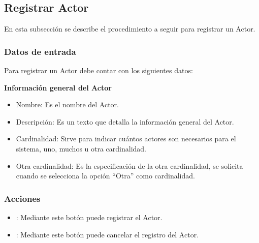 \subsection{Registrar Actor}
En esta subsección se describe el procedimiento a seguir para registrar un Actor.

\subsubsection{Datos de entrada}
\begin{description}
	\item Para registrar un Actor debe contar con los siguientes datos: \hspace{10pt}
	\begin{description}
	    \item \textbf{Información general del Actor}
	    \begin{itemize}
		  \item Nombre: Es el nombre del Actor.
		  \item Descripción: Es un texto que detalla la información general del Actor.
		  \item Cardinalidad: Sirve para indicar cuántos actores son necesarios para el sistema, uno, muchos u otra cardinalidad.
		  \item Otra cardinalidad: Es la especificación de la otra cardinalidad, se solicita cuando se selecciona la opción ``Otra'' como cardinalidad.
	    \end{itemize}
	 \end{description}
\end{description}

\subsubsection{Acciones}
\begin{itemize}
 \item {}: Mediante este botón puede registrar el Actor.
 \item {}: Mediante este botón puede cancelar el registro del Actor.
\end{itemize}
	
	
